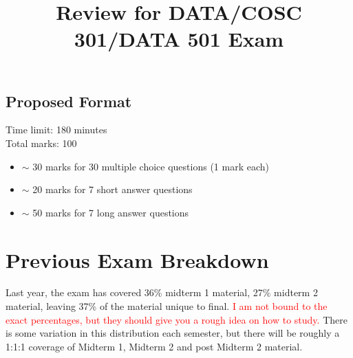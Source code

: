 \documentclass[12pt]{article}%
\date{}
\begin{document}
\title{Review for DATA/COSC 301/DATA 501 Exam}
\maketitle

\vspace{-3cm}


\subsection*{Proposed Format}

Time limit: 180 minutes\\
Total marks: 100 

\begin{itemize}[topsep=0pt, noitemsep]
\item $\sim$  30 marks for 30 multiple choice questions (1 mark each)%
\item $\sim$ 20 marks for 7 short answer questions
\item $\sim$ 50 marks for 7 long answer questions
\end{itemize}


\section*{Previous Exam Breakdown}

Last year, the exam has covered 36\% midterm 1 material, 27\%  midterm 2 material, leaving 37\% of the material unique to final. %
\noindent \textcolor{red}{I am not bound to the exact percentages, but they should give you a rough idea on how to study.}
There is some variation in this distribution each semester, but there will be roughly a 1:1:1 coverage of Midterm 1, Midterm 2 and post Midterm 2 material. 
\end{document}

